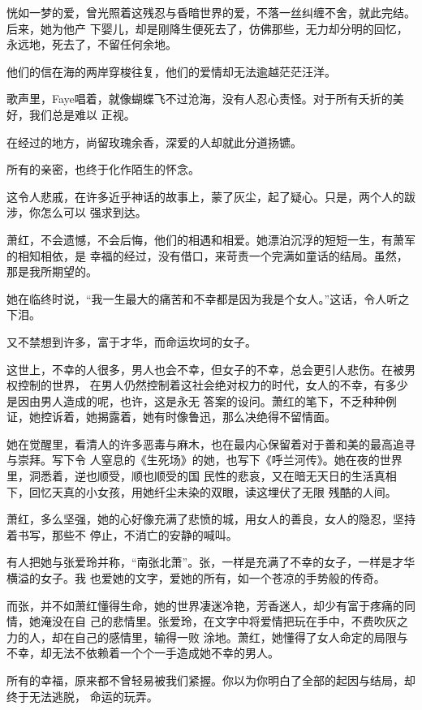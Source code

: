 		恍如一梦的爱，曾光照着这残忍与昏暗世界的爱，不落一丝纠缠不舍，就此完结。后来，她为他产
	下婴儿，却是刚降生便死去了，仿佛那些，无力却分明的回忆，永远地，死去了，不留任何余地。


		他们的信在海的两岸穿梭往复，他们的爱情却无法逾越茫茫汪洋。

		歌声里，Faye唱着，就像蝴蝶飞不过沧海，没有人忍心责怪。对于所有夭折的美好，我们总是难以
	正视。

		在经过的地方，尚留玫瑰余香，深爱的人却就此分道扬镳。

		所有的亲密，也终于化作陌生的怀念。

		这令人悲戚，在许多近乎神话的故事上，蒙了灰尘，起了疑心。只是，两个人的跋涉，你怎么可以
	强求到达。

		萧红，不会遗憾，不会后悔，他们的相遇和相爱。她漂泊沉浮的短短一生，有萧军的相知相依，是
	幸福的经过，没有借口，来苛责一个完满如童话的结局。虽然，那是我所期望的。


		她在临终时说，“我一生最大的痛苦和不幸都是因为我是个女人。”这话，令人听之下泪。

		又不禁想到许多，富于才华，而命运坎坷的女子。

		这世上，不幸的人很多，男人也会不幸，但女子的不幸，总会更引人悲伤。在被男权控制的世界，
	在男人仍然控制着这社会绝对权力的时代，女人的不幸，有多少是因由男人造成的呢，也许，这是永无
	答案的设问。萧红的笔下，不乏种种例证，她控诉着，她揭露着，她有时像鲁迅，那么决绝得不留情面。

		她在觉醒里，看清人的许多恶毒与麻木，也在最内心保留着对于善和美的最高追寻与崇拜。写下令
	人窒息的《生死场》的她，也写下《呼兰河传》。她在夜的世界里，洞悉着，逆也顺受，顺也顺受的国
	民性的悲哀，又在暗无天日的生活真相下，回忆天真的小女孩，用她纤尘未染的双眼，读这埋伏了无限
	残酷的人间。

		萧红，多么坚强，她的心好像充满了悲愤的城，用女人的善良，女人的隐忍，坚持着书写，那些不
	停止，不消亡的安静的喊叫。


		有人把她与张爱玲并称，“南张北萧”。张，一样是充满了不幸的女子，一样是才华横溢的女子。我
	也爱她的文字，爱她的所有，如一个苍凉的手势般的传奇。

		而张，并不如萧红懂得生命，她的世界凄迷冷艳，芳香迷人，却少有富于疼痛的同情，她淹没在自
	己的悲情里。张爱玲，在文字中将爱情把玩在手中，不费吹灰之力的人，却在自己的感情里，输得一败
	涂地。萧红，她懂得了女人命定的局限与不幸，却无法不依赖着一个个一手造成她不幸的男人。

		所有的幸福，原来都不曾轻易被我们紧握。你以为你明白了全部的起因与结局，却终于无法逃脱，
	命运的玩弄。

